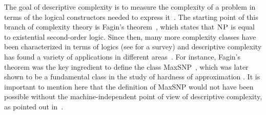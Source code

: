 
%
%
%
%	
%	
%	
%	
%

The goal of descriptive complexity is to measure the complexity of a problem in terms of the logical constructors needed to express it~\cite{immerman1999descriptive}. 
The starting point of this branch of complexity theory is Fagin's theorem~\cite{F75}, which states that $\text{\sc NP}$ is equal to existential second-order logic. Since then, many more complexity classes have been characterized in terms of logics (see \cite{G07} for a survey) and descriptive complexity has found a variety of applications in different areas~\cite{immerman1999descriptive, L04}.
For instance, Fagin's theorem was the key ingredient to define the class {\sc MaxSNP}~\cite{PY91}, which was later shown to be a fundamental class in the study of hardness of approximation \cite{ALMSS98}. 
It is important to mention here that the definition of {\sc MaxSNP} would not have been possible without the machine-independent point of view of descriptive complexity, as pointed out in~\cite{PY91}.

